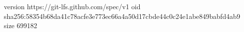 version https://git-lfs.github.com/spec/v1
oid sha256:58354b68da41c78acfe3e773ec66a4a50d17cbde44c0c24e1abe849babfd4ab9
size 699182
